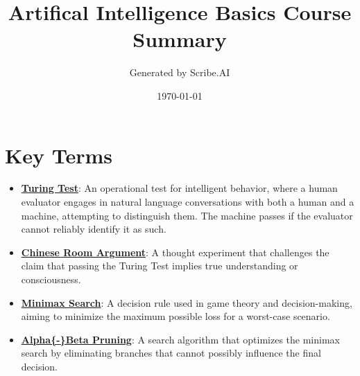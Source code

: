 \documentclass{article}%
\title{Artifical Intelligence Basics Course Summary}%
\author{Generated by Scribe.AI}%
\date{\today}%
\begin{document}
%
\normalsize%
\maketitle%
\section{Key Terms}%
\label{sec:KeyTerms}%
\begin{itemize}[leftmargin=*]%
\item \href{https://purdue.brightspace.com/d2l/common/assets/pdfjs-d2l-dist/1.0.14-legacy/web/viewer.html?file=\%2Fcontent\%2Fenforced\%2F1095467-wl.202510.CS.24300.001\%2F02L2-Intro.pdf\%3Fou\%3D1095467\&lang=en-us\&container=d2l-fileviewer-rendered-pdf\&fullscreen=d2l-fileviewer-rendered-pdf-dialog\&height=667#page=6}{\textbf{Turing Test}}: An operational test for intelligent behavior, where a human evaluator engages in natural language conversations with both a human and a machine, attempting to distinguish them. The machine passes if the evaluator cannot reliably identify it as such.%
\item \href{https://purdue.brightspace.com/d2l/common/assets/pdfjs-d2l-dist/1.0.14-legacy/web/viewer.html?file=\%2Fcontent\%2Fenforced\%2F1095467-wl.202510.CS.24300.001\%2F02L2-Intro.pdf\%3Fou\%3D1095467\&lang=en-us\&container=d2l-fileviewer-rendered-pdf\&fullscreen=d2l-fileviewer-rendered-pdf-dialog\&height=667#page=7}{\textbf{Chinese Room Argument}}: A thought experiment that challenges the claim that passing the Turing Test implies true understanding or consciousness.%
\item \href{https://purdue.brightspace.com/d2l/common/assets/pdfjs-d2l-dist/1.0.14-legacy/web/viewer.html?file=\%2Fcontent\%2Fenforced\%2F1095467-wl.202510.CS.24300.001\%2F02L2-Intro.pdf\%3Fou\%3D1095467\&lang=en-us\&container=d2l-fileviewer-rendered-pdf\&fullscreen=d2l-fileviewer-rendered-pdf-dialog\&height=667#page=22}{\textbf{Minimax Search}}: A decision rule used in game theory and decision{-}making, aiming to minimize the maximum possible loss for a worst{-}case scenario.%
\item \href{https://purdue.brightspace.com/d2l/common/assets/pdfjs-d2l-dist/1.0.14-legacy/web/viewer.html?file=\%2Fcontent\%2Fenforced\%2F1095467-wl.202510.CS.24300.001\%2F02L2-Intro.pdf\%3Fou\%3D1095467\&lang=en-us\&container=d2l-fileviewer-rendered-pdf\&fullscreen=d2l-fileviewer-rendered-pdf-dialog\&height=667#page=23}{\textbf{Alpha\{{-}\}Beta Pruning}}: A search algorithm that optimizes the minimax search by eliminating branches that cannot possibly influence the final decision.%

\end{itemize}
\end{document}
